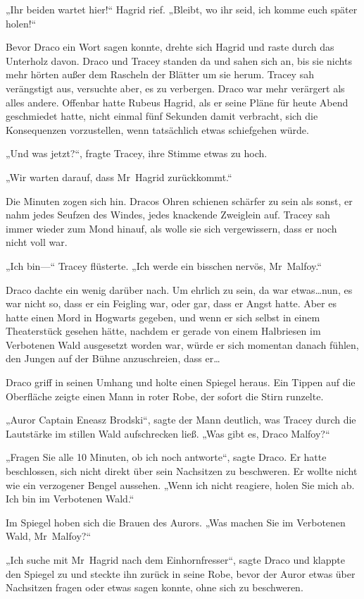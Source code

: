 {„Ihr beiden wartet hier!“ Hagrid rief. „Bleibt, wo ihr seid, ich komme euch später holen!“

Bevor Draco ein Wort sagen konnte, drehte sich Hagrid und raste durch das Unterholz davon. Draco und Tracey standen da und sahen sich an, bis sie nichts mehr hörten außer dem Rascheln der Blätter um sie herum. Tracey sah verängstigt aus, versuchte aber, es zu verbergen. Draco war mehr verärgert als alles andere. Offenbar hatte Rubeus Hagrid, als er seine Pläne für heute Abend geschmiedet hatte, nicht einmal fünf Sekunden damit verbracht, sich die Konsequenzen vorzustellen, wenn tatsächlich etwas schiefgehen würde.

„Und was jetzt?“, fragte Tracey, ihre Stimme etwas zu hoch.

„Wir warten darauf, dass Mr~Hagrid zurückkommt.“

Die Minuten zogen sich hin. Dracos Ohren schienen schärfer zu sein als sonst, er nahm jedes Seufzen des Windes, jedes knackende Zweiglein auf. Tracey sah immer wieder zum Mond hinauf, als wolle sie sich vergewissern, dass er noch nicht voll war.

„Ich bin—“ Tracey flüsterte. „Ich werde ein bisschen nervös, Mr~Malfoy.“

Draco dachte ein wenig darüber nach. Um ehrlich zu sein, da war etwas…nun, es war nicht so, dass er ein Feigling war, oder gar, dass er Angst hatte. Aber es hatte einen Mord in Hogwarts gegeben, und wenn er sich selbst in einem Theaterstück gesehen hätte, nachdem er gerade von einem Halbriesen im Verbotenen Wald ausgesetzt worden war, würde er sich momentan danach fühlen, den Jungen auf der Bühne anzuschreien, dass er…

Draco griff in seinen Umhang und holte einen Spiegel heraus. Ein Tippen auf die Oberfläche zeigte einen Mann in roter Robe, der sofort die Stirn runzelte.

„Auror Captain Eneasz Brodski“, sagte der Mann deutlich, was Tracey durch die Lautstärke im stillen Wald aufschrecken ließ. „Was gibt es, Draco Malfoy?“

„Fragen Sie alle 10 Minuten, ob ich noch antworte“, sagte Draco. Er hatte beschlossen, sich nicht direkt über sein Nachsitzen zu beschweren. Er wollte nicht wie ein verzogener Bengel aussehen. „Wenn ich nicht reagiere, holen Sie mich ab. Ich bin im Verbotenen Wald.“

Im Spiegel hoben sich die Brauen des Aurors. „Was machen Sie im Verbotenen Wald, Mr~Malfoy?“

„Ich suche mit Mr~Hagrid nach dem Einhornfresser“, sagte Draco und klappte den Spiegel zu und steckte ihn zurück in seine Robe, bevor der Auror etwas über Nachsitzen fragen oder etwas sagen konnte, ohne sich zu beschweren.

}
